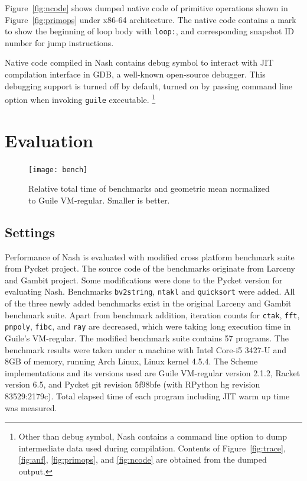 \documentclass[preprint, 10pt]{sigplanconf}
\begin{document}
Figure~\hyperref[fig:ncode]{\ref{fig:ncode}} shows dumped native code of
primitive operations shown in Figure~\hyperref[fig:primops]{\ref{fig:primops}}
under x86-64 architecture. The native code contains a mark to show the beginning
of loop body with \texttt{loop:}, and corresponding snapshot ID number for jump
instructions.

Native code compiled in Nash contains debug symbol to interact with JIT
compilation interface in GDB, a well-known open-source debugger. This debugging
support is turned off by default, turned on by passing command line option when
invoking \texttt{guile} executable.
\footnote{Other than debug symbol, Nash contains a command line option to dump
  intermediate data used during compilation. Contents of
  Figure~\hyperref[fig:anf]{\ref{fig:trace}}, \hyperref[fig:anf]{\ref{fig:anf}},
  \hyperref[fig:primops]{\ref{fig:primops}}, and
  \hyperref[fig:ncode]{\ref{fig:ncode}} are obtained from the dumped output.}

\section{Evaluation}
\label{sec:evaluation}

\begin{figure}
  \centering
  \texttt{[image: bench]}
  \caption{Relative total time of benchmarks and geometric mean normalized to
    Guile VM-regular. Smaller is better.}
\label{fig:bench}
\end{figure}

\subsection{Settings}

Performance of Nash is evaluated with modified cross platform benchmark suite
from Pycket project. The source code of the benchmarks originate from Larceny
and Gambit project. Some modifications were done to the Pycket version for
evaluating Nash. Benchmarks \texttt{bv2string}, \texttt{ntakl} and
\texttt{quicksort} were added. All of the three newly added benchmarks exist in
the original Larceny and Gambit benchmark suite. Apart from benchmark addition,
iteration counts for \texttt{ctak}, \texttt{fft}, \texttt{pnpoly},
\texttt{fibc}, and \texttt{ray} are decreased, which were taking long execution
time in Guile's VM-regular. The modified benchmark suite contains 57
programs. The benchmark results were taken under a machine with Intel Core-i5
3427-U and 8GB of memory, running Arch Linux, Linux kernel 4.5.4. The Scheme
implementations and its versions used are Guile VM-regular version 2.1.2, Racket
version 6.5, and Pycket git revision 5f98bfe (with RPython hg revision
83529:2179c). Total elapsed time of each program including JIT warm up time was
measured.
\end{document}
